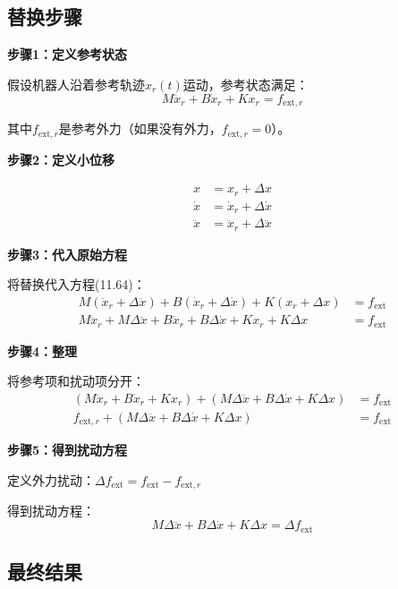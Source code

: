 \documentclass[12pt,a4paper]{article}
\begin{document}
\subsection{替换步骤}

\textbf{步骤1：定义参考状态}

假设机器人沿着参考轨迹$x_r(t)$运动，参考状态满足：
\begin{equation}
M\ddot{x}_r + B\dot{x}_r + Kx_r = f_{\text{ext},r}
\end{equation}

其中$f_{\text{ext},r}$是参考外力（如果没有外力，$f_{\text{ext},r} = 0$）。

\textbf{步骤2：定义小位移}

\begin{align}
x &= x_r + \Delta x \\
\dot{x} &= \dot{x}_r + \Delta \dot{x} \\
\ddot{x} &= \ddot{x}_r + \Delta \ddot{x}
\end{align}

\textbf{步骤3：代入原始方程}

将替换代入方程(11.64)：
\begin{align}
M(\ddot{x}_r + \Delta \ddot{x}) + B(\dot{x}_r + \Delta \dot{x}) + K(x_r + \Delta x) &= f_{\text{ext}} \\
M\ddot{x}_r + M\Delta \ddot{x} + B\dot{x}_r + B\Delta \dot{x} + Kx_r + K\Delta x &= f_{\text{ext}}
\end{align}

\textbf{步骤4：整理}

将参考项和扰动项分开：
\begin{align}
(M\ddot{x}_r + B\dot{x}_r + Kx_r) + (M\Delta \ddot{x} + B\Delta \dot{x} + K\Delta x) &= f_{\text{ext}} \\
f_{\text{ext},r} + (M\Delta \ddot{x} + B\Delta \dot{x} + K\Delta x) &= f_{\text{ext}}
\end{align}

\textbf{步骤5：得到扰动方程}

定义外力扰动：$\Delta f_{\text{ext}} = f_{\text{ext}} - f_{\text{ext},r}$

得到扰动方程：
\begin{equation}
M\Delta \ddot{x} + B\Delta \dot{x} + K\Delta x = \Delta f_{\text{ext}} \tag{11.64-perturbation}
\end{equation}

\subsection{最终结果}
\end{document}
